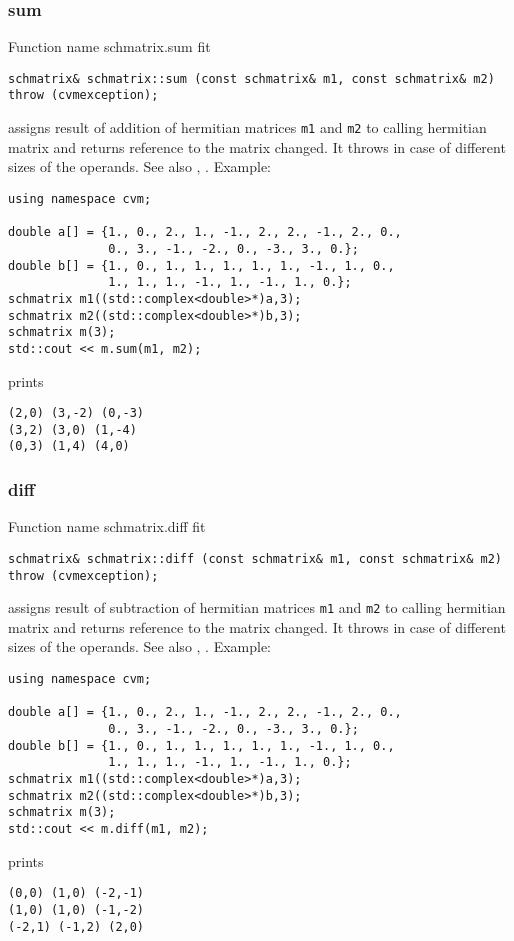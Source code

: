 \subsubsection{sum}
Function%
\pdfdest name {schmatrix.sum} fit
\begin{verbatim}
schmatrix& schmatrix::sum (const schmatrix& m1, const schmatrix& m2)
throw (cvmexception);
\end{verbatim}
assigns  result of addition of
hermitian matrices \verb"m1" and \verb"m2"  to  calling hermitian matrix
and returns  reference to
the matrix changed.
It throws  
in case of different sizes 
of the operands.
See also ,
.
Example:
\begin{Verbatim}
using namespace cvm;

double a[] = {1., 0., 2., 1., -1., 2., 2., -1., 2., 0.,
              0., 3., -1., -2., 0., -3., 3., 0.};
double b[] = {1., 0., 1., 1., 1., 1., 1., -1., 1., 0.,
              1., 1., 1., -1., 1., -1., 1., 0.};
schmatrix m1((std::complex<double>*)a,3);
schmatrix m2((std::complex<double>*)b,3);
schmatrix m(3);
std::cout << m.sum(m1, m2);
\end{Verbatim}
prints
\begin{Verbatim}
(2,0) (3,-2) (0,-3)
(3,2) (3,0) (1,-4)
(0,3) (1,4) (4,0)
\end{Verbatim}
\newpage




\subsubsection{diff}
Function%
\pdfdest name {schmatrix.diff} fit
\begin{verbatim}
schmatrix& schmatrix::diff (const schmatrix& m1, const schmatrix& m2)
throw (cvmexception);
\end{verbatim}
assigns  result of subtraction of
hermitian matrices \verb"m1" and \verb"m2" to  calling hermitian matrix
and returns  reference to
the matrix changed.
It throws  
in case of different sizes 
of the operands.
See also ,
.
Example:
\begin{Verbatim}
using namespace cvm;

double a[] = {1., 0., 2., 1., -1., 2., 2., -1., 2., 0.,
              0., 3., -1., -2., 0., -3., 3., 0.};
double b[] = {1., 0., 1., 1., 1., 1., 1., -1., 1., 0.,
              1., 1., 1., -1., 1., -1., 1., 0.};
schmatrix m1((std::complex<double>*)a,3);
schmatrix m2((std::complex<double>*)b,3);
schmatrix m(3);
std::cout << m.diff(m1, m2);
\end{Verbatim}
prints
\begin{Verbatim}
(0,0) (1,0) (-2,-1)
(1,0) (1,0) (-1,-2)
(-2,1) (-1,2) (2,0)
\end{Verbatim}
\newpage




